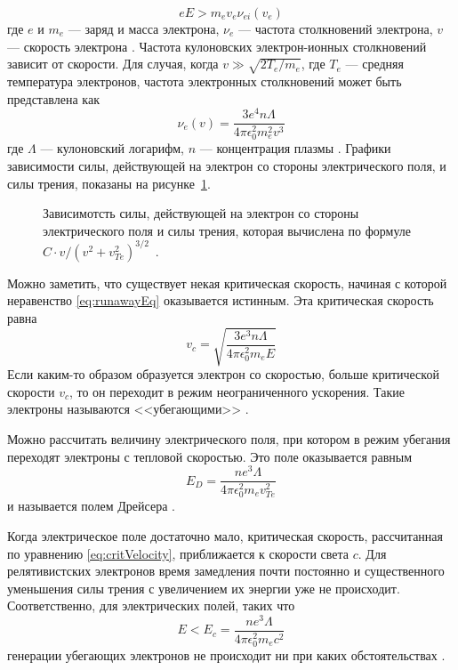 \begin{equation}
  \label{eq:runawayEq}
  e E >  m_e v_e \nu_{ei}(v_e)
\end{equation}
где $e$ и $m_e$ --- заряд и масса электрона, $\nu_{e}$ --- частота столкновений электрона, $v$ --- скорость электрона \cite{Wesson2004}. Частота кулоновских электрон-ионных столкновений зависит от скорости. Для случая, когда $v \gg \sqrt{ 2 T_e / m_e }$, где $T_e$ --- средняя температура электронов, частота электронных столкновений может быть представлена как 
\begin{equation*}
  \nu_{e}(v) = \frac{ 3 e^4 n \Lambda }{ 4 \pi \epsilon_0^2 m_e^2 v^3 }
\end{equation*} 
где $\Lambda$ --- кулоновский логарифм, $n$ --- концентрация плазмы \cite{Wesson2004}. Графики зависимости силы, действующей на электрон со стороны электрического поля, и силы трения, показаны на рисунке~\ref{fig:runawayForces}.

\begin{figure}[ht]
  \caption{ Зависимотсть силы, действующей на электрон со стороны электрического поля и силы трения, которая вычислена по формуле $ C \cdot v/( v^2 + v_{Te}^2 )^{3/2} $~\cite{Golant1977}.}
  \label{fig:runawayForces}
\end{figure}

Можно заметить, что существует некая критическая скорость, начиная с которой неравенство \ref{eq:runawayEq} оказывается истинным. Эта критическая скорость равна
\begin{equation}
  \label{eq:critVelocity}
  v_c = \sqrt{ \frac{ 3 e^3 n \Lambda }{ 4 \pi \epsilon_0^2 m_e E } }
\end{equation}
Если каким-то образом образуется электрон со скоростью, больше критической скорости $v_c$, то он переходит в режим неограниченного ускорения. Такие электроны называются <<убегающими>> \cite{Golant1977}.

Можно рассчитать величину электрического поля, при котором в режим убегания переходят электроны с тепловой скоростью. Это поле оказывается равным 
\begin{equation}
  \label{eq:dreicerField}
  E_D = \frac{ n e^3 \Lambda }{ 4 \pi \epsilon_0^2 m_e v_{Te}^2 }
\end{equation}
и называется полем Дрейсера \cite{Dreicer1959,Golant1977,Wesson2004}. 

Когда электрическое поле достаточно мало, критическая скорость, рассчитанная по уравнению \ref{eq:critVelocity}, приближается к скорости света $c$. Для релятивистских электронов время замедления почти постоянно и существенного уменьшения силы трения с увеличением их энергии уже не происходит. Соответственно, для электрических полей, таких что
\begin{equation}
  \label{eq:criticalField}
  E < E_c = \frac{ n e^3 \Lambda }{ 4 \pi \epsilon_0^2 m_e c^2 }
\end{equation}
генерации убегающих электронов не происходит ни при каких обстоятельствах \cite{Wesson2004}.

